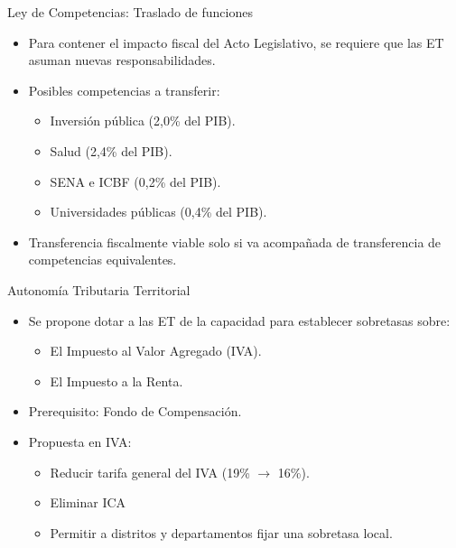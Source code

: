 \begin{frame}{Ley de Competencias: Traslado de funciones}
\begin{itemize}
  \item Para contener el impacto fiscal del Acto Legislativo, se requiere que las ET asuman nuevas responsabilidades.
  \item Posibles competencias a transferir:
  \begin{itemize}
    \item Inversión pública (2,0\% del PIB).
    \item Salud (2,4\% del PIB).
    \item SENA e ICBF (0,2\% del PIB).
    \item Universidades públicas (0,4\% del PIB).
  \end{itemize}
  \item Transferencia fiscalmente viable solo si va acompañada de transferencia de competencias equivalentes.
\end{itemize}
\end{frame}
\begin{frame}{Autonomía Tributaria Territorial}
\begin{itemize}
  \item Se propone dotar a las ET de la capacidad para establecer sobretasas sobre:
  \begin{itemize}
    \item El Impuesto al Valor Agregado (IVA).  
    \item El Impuesto a la Renta.  
  \end{itemize}
  \item Prerequisito: Fondo de Compensación.

  \item Propuesta en IVA:
  \begin{itemize}
    \item Reducir tarifa general del IVA (19\% $\rightarrow$ 16\%).
    \item Eliminar ICA
    \item Permitir a distritos y departamentos fijar una sobretasa local.
  \end{itemize}
\end{itemize}
\end{frame}

